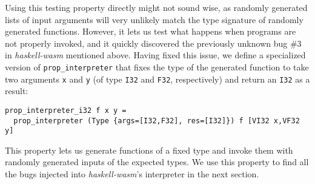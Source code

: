 \documentclass[sigconf,review,anonymous]{acmart}
\newcommand{\mutagen}{\textsc{Mutagen}\xspace}
\begin{document}
Using this testing property directly might not sound wise, as randomly generated
lists of input arguments will very unlikely match the type signature of randomly
generated functions.
%
However, it lets us test what happens when programs are not properly invoked,
and it quickly discovered the previously unknown bug \#3 in
\textit{haskell-wasm} mentioned above.
%
Having fixed this issue, we define a specialized version of
\texttt{prop\_interpreter} that fixes the type of the generated function to take
two arguments \texttt{x} and \texttt{y} (of type \texttt{I32} and \texttt{F32},
respectively) and return an \texttt{I32} as a result:

\begin{verbatim}
prop_interpreter_i32 f x y = 
  prop_interpreter (Type {args=[I32,F32], res=[I32]}) f [VI32 x,VF32 y]
\end{verbatim}

\noindent This property lets us generate functions of a fixed type and invoke
them with randomly generated inputs of the expected types.
%
%
We use this property to find all the bugs injected into \textit{haskell-wasm}'s
interpreter in the next section.
%


\end{document}
